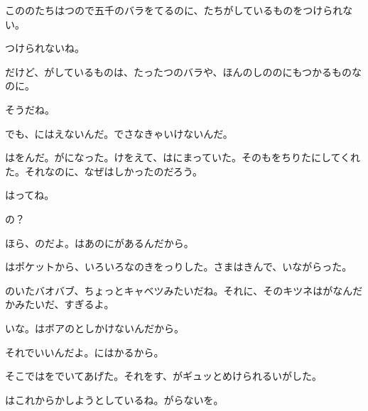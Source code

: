 こののたちはつので五千のバラをてるのに、たちがしているものをつけられない。

つけられないね。

だけど、がしているものは、たったつのバラや、ほんのしののにもつかるものなのに。

そうだね。

でも、にはえないんだ。でさなきゃいけないんだ。

はをんだ。がになった。けをえて、はにまっていた。そのもをちりたにしてくれた。それなのに、なぜはしかったのだろう。

はってね。

の？

ほら、のだよ。はあのにがあるんだから。

はポケットから、いろいろなのきをっりした。さまはきんで、いながらった。

のいたバオバブ、ちょっとキャベツみたいだね。それに、そのキツネはがなんだかみたいだ、すぎるよ。

いな。はボアのとしかけないんだから。

それでいいんだよ。にはかるから。

そこではをでいてあげた。それをす、がギュッとめけられるいがした。

はこれからかしようとしているね。がらないを。

